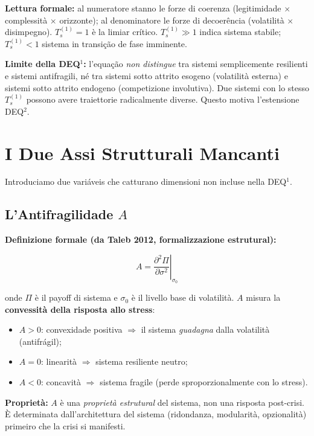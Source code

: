 \Proved{} \textbf{Lettura formale:} al numeratore stanno le forze di
coerenza (legitimidade $\times$ complessità $\times$ orizzonte); al denominatore le
forze di decoerência (volatilità $\times$ disimpegno). \(T_s^{(1)} = 1\) è la
limiar crítico. \(T_s^{(1)} \gg 1\) indica sistema stabile;
\(T_s^{(1)} < 1\) sistema in transição de fase imminente.

\Conj{} \textbf{Limite della DEQ$^1$:} l'equação \emph{non distingue} tra
sistemi semplicemente resilienti e sistemi antifragili, né tra sistemi
sotto attrito esogeno (volatilità esterna) e sistemi sotto attrito
endogeno (competizione involutiva). Due sistemi con lo stesso
\(T_s^{(1)}\) possono avere traiettorie radicalmente diverse. Questo
motiva l'estensione DEQ$^2$.



\section{I Due Assi Strutturali
Mancanti}\label{i-due-assi-strutturali-mancanti}

Introduciamo due variáveis che catturano dimensioni non incluse nella
DEQ$^1$.

\subsection{\texorpdfstring{L'Antifragilidade
\(A\)}{L'Antifragilidade A}}\label{lantifragilituxe0-a}

\Proved{} \textbf{Definizione formale (da Taleb 2012, formalizzazione
estrutural):}

\[
A = \left.\frac{\partial^2 \Pi}{\partial \sigma^2}\right|_{\sigma_0}
\]

onde \(\Pi\) è il payoff di sistema e \(\sigma_0\) è il livello base di
volatilità. \(A\) misura la \textbf{convessità della risposta allo
stress}:

\begin{itemize}
\tightlist
\item
  \(A > 0\): convexidade positiva $\Rightarrow$ il sistema \emph{guadagna} dalla
  volatilità (antifrágil);
\item
  \(A = 0\): linearità $\Rightarrow$ sistema resiliente neutro;
\item
  \(A < 0\): concavità $\Rightarrow$ sistema fragile (perde sproporzionalmente con
  lo stress).
\end{itemize}

\Hypoth{} \textbf{Proprietà:} \(A\) è una \emph{proprietà estrutural}
del sistema, non una risposta post-crisi. È determinata
dall'architettura del sistema (ridondanza, modularità, opzionalità)
primeiro che la crisi si manifesti.

